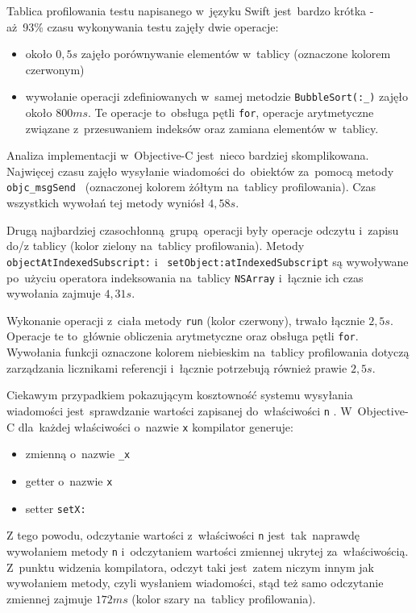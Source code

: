 \documentclass[mgr, shortabstract]{iithesis}
\newcommand{\swiftinline}[1]{
    \texttt{#1}
}
\newcommand{\objcinline}[1]{
    \texttt{#1}
}
\begin{document}
Tablica profilowania testu napisanego w~języku Swift jest~bardzo krótka - aż~93\% czasu wykonywania testu zajęły dwie operacje:

\begin{itemize}
    \item około $0,5s$ zajęło porównywanie elementów w~tablicy (oznaczone kolorem czerwonym)
    \item wywołanie operacji zdefiniowanych w~samej metodzie \swiftinline{BubbleSort(:_)} zajęło około $800 ms$. Te operacje to~obsługa pętli \texttt{for}, operacje arytmetyczne związane z~przesuwaniem indeksów oraz zamiana elementów w~tablicy.
\end{itemize}

Analiza implementacji w~Objective-C jest~nieco bardziej skomplikowana. Najwięcej czasu zajęło wysyłanie wiadomości do~obiektów za~pomocą metody \objcinline{objc_msgSend } (oznaczonej kolorem żółtym na~tablicy profilowania). Czas wszystkich wywołań tej metody wyniósł $4,58s$.

Drugą najbardziej czasochłonną grupą operacji były operacje odczytu i~zapisu do/z tablicy (kolor zielony na~tablicy profilowania). Metody \objcinline{objectAtIndexedSubscript:} i~\objcinline{setObject:atIndexedSubscript} są wywoływane po~użyciu operatora indeksowania na~tablicy \objcinline{NSArray} i~łącznie ich czas wywołania zajmuje $4,31s$.

Wykonanie operacji z~ciała metody \objcinline{run} (kolor czerwony), trwało łącznie $2,5s$. Operacje te to~głównie obliczenia arytmetyczne oraz obsługa pętli \texttt{for}. Wywołania funkcji oznaczone kolorem niebieskim na~tablicy profilowania dotyczą zarządzania licznikami referencji i~łącznie potrzebują  również prawie $2,5s$.

Ciekawym przypadkiem pokazującym kosztowność systemu wysyłania wiadomości jest~sprawdzanie wartości zapisanej do~właściwości \objcinline{n}. W~Objective-C dla~każdej właściwości o~nazwie \objcinline{x} kompilator generuje:

\begin{itemize}
    \item zmienną o~nazwie \objcinline{_x}
    \item getter o~nazwie \objcinline{x}
    \item setter \objcinline{setX:}
\end{itemize}

Z tego powodu, odczytanie wartości z~właściwości  \objcinline{n} jest~tak~naprawdę wywołaniem metody \objcinline{n} i~odczytaniem wartości zmiennej ukrytej za~właściwością. Z~punktu widzenia kompilatora, odczyt taki jest~zatem niczym innym jak wywołaniem metody, czyli wysłaniem wiadomości, stąd też samo odczytanie zmiennej zajmuje $172ms$ (kolor szary na~tablicy profilowania).
\end{document}
